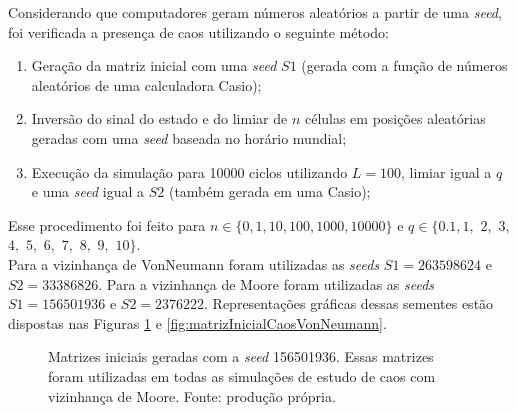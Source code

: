 \documentclass[
	12pt,				%
	openright,			%
	twoside,			%
	a4paper,			%
	english,			%
	french,				%
	spanish,			%
	brazil				%
	]{abntex2}
\begin{document}
Considerando que computadores geram números aleatórios a partir de uma \textit{seed}, foi verificada a presença de caos utilizando o seguinte método:
  \begin{enumerate}
    \item Geração da matriz inicial com uma \textit{seed} $S1$ (gerada com a função de números aleatórios de uma calculadora Casio);
    \item Inversão do sinal do estado e do limiar de $n$ células em posições aleatórias geradas com uma \textit{seed} baseada no horário mundial;
    \item Execução da simulação para 10000 ciclos utilizando $L=100$, limiar igual a $q$ e uma \textit{seed} igual a $S2$ (também gerada em uma Casio);
  \end{enumerate}
	Esse procedimento foi feito para $n\in\{0, 1, 10, 100, 1000, 10000\}$ e $q\in\{0.1, 1,$ $2,$ $3,$ $4,$ $5,$ $6,$ $7,$ $8,$ $9,$ $10\}$.\\
  Para a vizinhança de VonNeumann foram utilizadas as \textit{seeds} $S1=263598624$ e $S2=33386826$. Para a vizinhança de Moore foram utilizadas as \textit{seeds} $S1=156501936$ e $S2=2376222$. Representações gráficas dessas sementes estão dispostas nas Figuras \ref{fig:matrizInicialCaosMoore} e \ref{fig:matrizInicialCaosVonNeumann}.
  \begin{figure}[h]
    \hfill
    \caption{Matrizes iniciais geradas com a \textit{seed} 156501936. Essas matrizes foram utilizadas em todas as simulações de estudo de caos com vizinhança de Moore. Fonte: produção própria.}
    \label{fig:matrizInicialCaosMoore}
  \end{figure}
\end{document}
